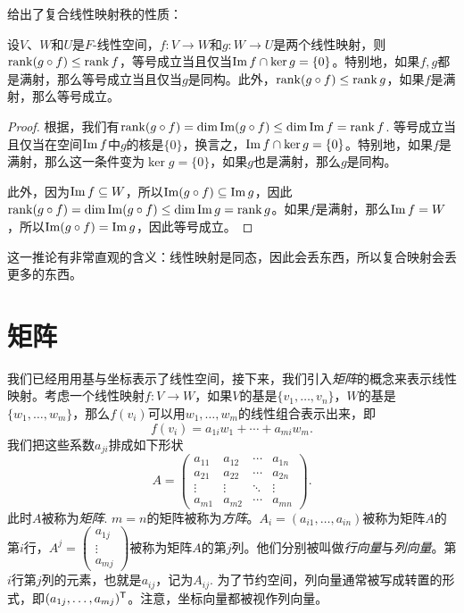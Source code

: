  给出了复合线性映射秩的性质：
\begin{corollary}\label{cor:rank-composition}
设$V$、$W$和$U$是$F$-线性空间，$f:V\to W$和$g:W\to U$是两个线性映射，则$\operatorname*{rank} (g\circ f)\leq \operatorname*{rank} f$，等号成立当且仅当$\operatorname*{Im} f\cap \ker g=\{0\}$。特别地，如果$f,g$都是满射，那么等号成立当且仅当$g$是同构。此外，$\operatorname*{rank} (g\circ f)\leq \operatorname*{rank} g$，如果$f$是满射，那么等号成立。
\end{corollary}
\begin{proof}
    根据，我们有$\operatorname*{rank} (g\circ f)=\dim\operatorname*{Im} (g\circ f)\leq \dim \operatorname*{Im} f=\operatorname*{rank} f$. 等号成立当且仅当在空间$\operatorname*{Im} f$中$g$的核是$\{0\}$，换言之，$\operatorname*{Im} f\cap \ker g=\{0\}$。特别地，如果$f$是满射，那么这一条件变为$\ker g=\{0\}$，如果$g$也是满射，那么$g$是同构。
    
    此外，因为$\operatorname*{Im} f\subseteq W$，所以$\operatorname*{Im} (g\circ f)\subseteq \operatorname*{Im} g$，因此$\operatorname*{rank} (g\circ f)=\dim\operatorname*{Im} (g\circ f)\leq \dim \operatorname*{Im} g=\operatorname*{rank} g$。如果$f$是满射，那么$\operatorname*{Im} f=W$，所以$\operatorname*{Im} (g\circ f)=\operatorname*{Im} g$，因此等号成立。
\end{proof}
这一推论有非常直观的含义：线性映射是同态，因此会丢东西，所以复合映射会丢更多的东西。

\section{矩阵}

我们已经用用基与坐标表示了线性空间，接下来，我们引入\emph{矩阵}的概念来表示线性映射。考虑一个线性映射$f:V\to W$，如果$V$的基是$\{v_1,\dots,v_n\}$，$W$的基是$\{w_1,\dots,w_m\}$，那么$f(v_i)$可以用$w_1,\dots,w_m$的线性组合表示出来，即
\[f(v_i)=a_{1i}w_1+\cdots+a_{mi}w_m.\]
我们把这些系数$a_{ji}$排成如下形状
\[A=\begin{pmatrix}
a_{11}&a_{12}&\cdots&a_{1n}\\
a_{21}&a_{22}&\cdots&a_{2n}\\
\vdots&\vdots&\ddots&\vdots\\
a_{m1}&a_{m2}&\cdots&a_{mn}
\end{pmatrix}.\]
此时$A$被称为\emph{矩阵}. $m=n$的矩阵被称为\emph{方阵}。$A_i=(a_{i1},\dots,a_{in})$被称为矩阵$A$的第$i$行，$A^j=\begin{pmatrix}a_{1j}\\\vdots\\a_{mj}\end{pmatrix}$被称为矩阵$A$的第$j$列。他们分别被叫做\emph{行向量}与\emph{列向量}。第$i$行第$j$列的元素，也就是$a_{ij}$，记为$A_{ij}$. 为了节约空间，列向量通常被写成转置的形式，即$(a_{1j},\dots,a_{mj})^{\mathsf{T}}$。注意，坐标向量都被视作列向量。

